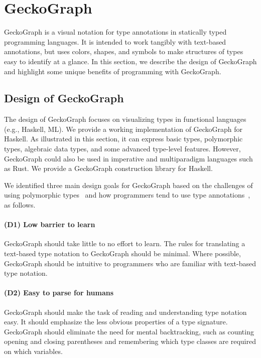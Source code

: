 \section{GeckoGraph}

GeckoGraph is a visual notation for type annotations in statically typed programming languages. It is intended to work tangibly with text-based annotations, but uses colors, shapes, and symbols to make structures of types easy to identify at a glance. In this section, we describe the design of GeckoGraph and highlight some unique benefits of programming with GeckoGraph.
        

\subsection{Design of GeckoGraph}
The design of GeckoGraph focuses on visualizing types in functional languages (e.g., Haskell, ML). We provide a working implementation of GeckoGraph for Haskell. As illustrated in this section, it can express basic types, polymorphic types, algebraic data types, and some advanced type-level features. However, GeckoGraph could also be used in imperative and multiparadigm languages such as Rust. We provide a GeckoGraph construction library for Haskell. 
        
We identified three main design goals for GeckoGraph based on the challenges of using polymorphic types~\cite{Jun2000-ec, Jun2000-yu} and how programmers tend to use type annotations~\cite{Justin_Lubin2021-yy}, as follows. 

\paragraph{\textbf{(D1) Low barrier to learn}}\label{goal1} GeckoGraph should take little to no effort to learn. The rules for translating a text-based type notation to GeckoGraph should be minimal. Where possible, GeckoGraph should be intuitive to programmers who are familiar with text-based type notation.

\paragraph{\textbf{(D2) Easy to parse for humans}}  \label{goal2} GeckoGraph should make the task of reading and understanding type notation easy. It should emphasize the less obvious properties of a type signature. GeckoGraph should eliminate the need for mental backtracking, such as counting opening and closing parentheses and remembering which type classes are required on which variables. 


